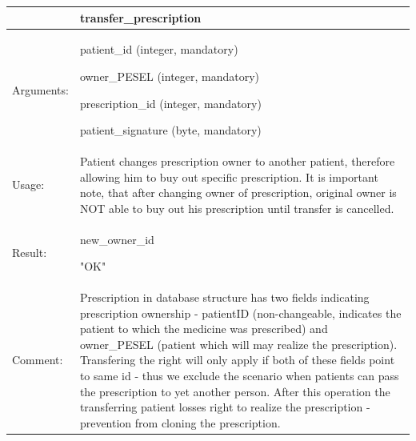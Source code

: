 \newpage

    \begin{longtable}{| p{3cm} | p{10.75cm} |}
    \hline
     & transfer\_prescription\\ \hline
    Arguments: &  \begin{packed_enum}
    	\item patient\_id (integer, mandatory)
    	\item owner\_PESEL (integer, mandatory)
		\item prescription\_id (integer, mandatory)
		\item patient\_signature (byte, mandatory)
	\end{packed_enum}     \\ \hline
    Usage: & Patient changes prescription owner to another patient, therefore allowing him to buy out specific prescription. It is important note, that after changing owner of prescription, original owner is NOT able to buy out his prescription until transfer is cancelled. \\ \hline
    Result: & \begin{packed_enum}
    	\item new\_owner\_id
		\item "OK"

	\end{packed_enum}     \\ \hline	
		Comment: & Prescription in database structure has two fields indicating prescription ownership - patientID (non-changeable, indicates the patient to which the medicine was prescribed) and owner\_PESEL (patient which will may realize the prescription).
		Transfering the right will only apply if both of these fields point to same id - thus we exclude the scenario when patients can pass the prescription to yet another person. After this operation the transferring patient losses right to realize the prescription - prevention from cloning the prescription.\\ \hline
    \end{longtable}



